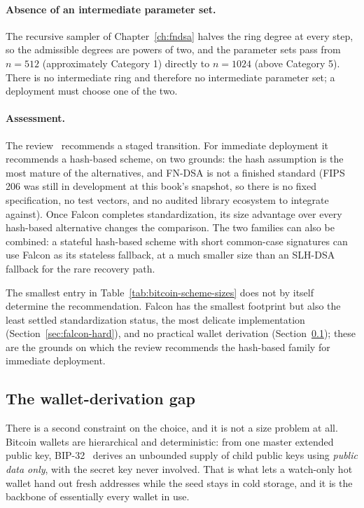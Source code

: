 \paragraph{Absence of an intermediate parameter set.}
The recursive sampler of Chapter~\ref{ch:fndsa} halves the ring degree at every
step, so the admissible degrees are powers of two, and the parameter sets pass
from $n=512$ (approximately Category 1) directly to $n=1024$ (above
Category 5). There is no intermediate ring and therefore no intermediate
parameter set; a deployment must choose one of the two.

\paragraph{Assessment.}
The review~\cite{blockstreamlattice2026} recommends a staged transition. For
immediate deployment it recommends a hash-based scheme, on two grounds: the
hash assumption is the most mature of the alternatives, and FN-DSA is not a
finished standard (FIPS 206 was still in development at this book's snapshot,
so there is no fixed specification, no test vectors, and no audited library
ecosystem to integrate against). Once Falcon completes standardization, its
size advantage over every hash-based alternative changes the comparison. The
two families can also be combined: a stateful hash-based scheme with short
common-case signatures can use Falcon as its stateless fallback, at a much
smaller size than an SLH-DSA fallback for the rare recovery path.

\begin{remark}
The smallest entry in Table~\ref{tab:bitcoin-scheme-sizes} does not by itself
determine the recommendation. Falcon has the smallest footprint but also the
least settled standardization status, the most delicate implementation
(Section~\ref{sec:falcon-hard}), and no practical wallet derivation
(Section~\ref{sec:pq-wallet-derivation}); these are the grounds on which the
review recommends the hash-based family for immediate deployment.
\end{remark}

\subsection{The wallet-derivation gap}
\label{sec:pq-wallet-derivation}

There is a second constraint on the choice, and it is not a size problem at all.
Bitcoin wallets are hierarchical and deterministic: from one master extended
public key, BIP-32~\cite{bip32} derives an unbounded supply of child public keys
using \emph{public data only}, with the secret key never involved. That is
what lets a watch-only hot wallet hand out fresh addresses while the seed stays
in cold storage, and it is the backbone of essentially every wallet in use.

